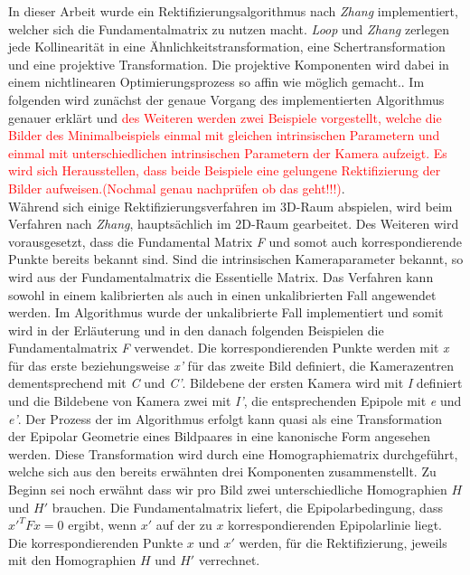 In dieser Arbeit wurde ein Rektifizierungsalgorithmus nach \textit{Zhang}\cite{ZZ} implementiert, welcher sich die Fundamentalmatrix zu nutzen macht. \textit{Loop} und \textit{Zhang} zerlegen jede Kollinearität in eine Ähnlichkeitstransformation, eine Schertransformation und eine projektive Transformation. Die projektive Komponenten wird dabei in einem nichtlinearen Optimierungsprozess so affin wie möglich gemacht.\cite{Fusiello,ZZ,phdextrinsicPara}. Im folgenden wird zunächst der genaue Vorgang des implementierten Algorithmus genauer erklärt und 
\textcolor{red}{des Weiteren werden zwei Beispiele vorgestellt, welche die Bilder des Minimalbeispiels einmal mit gleichen intrinsischen Parametern und einmal mit unterschiedlichen intrinsischen Parametern der Kamera aufzeigt. Es wird sich Herausstellen, dass beide Beispiele eine gelungene Rektifizierung der Bilder aufweisen.(Nochmal genau nachprüfen ob das geht!!!)}. \\


Während sich einige Rektifizierungsverfahren im 3D-Raum abspielen, wird beim Verfahren nach \textit{Zhang}, hauptsächlich im 2D-Raum gearbeitet. Des Weiteren wird vorausgesetzt, dass die Fundamental Matrix \textit{F} und somot auch korrespondierende Punkte bereits bekannt sind. Sind die intrinsischen Kameraparameter bekannt, so wird aus der Fundamentalmatrix die Essentielle Matrix. Das Verfahren kann sowohl in einem kalibrierten als auch in einen unkalibrierten Fall angewendet werden\cite{ZZ,phdextrinsicPara}. Im Algorithmus wurde der unkalibrierte Fall implementiert und somit wird in der Erläuterung und in den danach folgenden Beispielen die Fundamentalmatrix \textit{F} verwendet. Die korrespondierenden Punkte werden mit \textit{x} für das erste beziehungsweise \textit{x'} für das zweite Bild definiert, die Kamerazentren dementsprechend mit \textit{C} und \textit{C'}. Bildebene der ersten Kamera wird mit \textit{I} definiert und die Bildebene von Kamera zwei mit \textit{I'}, die entsprechenden Epipole mit \textit{e} und \textit{e'}. Der Prozess der im Algorithmus erfolgt kann quasi als eine Transformation der Epipolar Geometrie eines Bildpaares in eine kanonische Form angesehen werden. Diese Transformation wird durch eine Homographiematrix durchgeführt, welche sich aus den bereits erwähnten drei Komponenten zusammenstellt. Zu Beginn sei noch erwähnt dass wir pro Bild zwei unterschiedliche Homographien \ensuremath{H} und \ensuremath{H'} brauchen. Die Fundamentalmatrix liefert, die Epipolarbedingung, dass $x'^TFx=0$ ergibt, wenn $x'$ auf der zu $x$ korrespondierenden Epipolarlinie liegt. Die korrespondierenden Punkte $x$ und $x'$ werden, für die Rektifizierung, jeweils mit den Homographien $H$ und $H'$ verrechnet.

